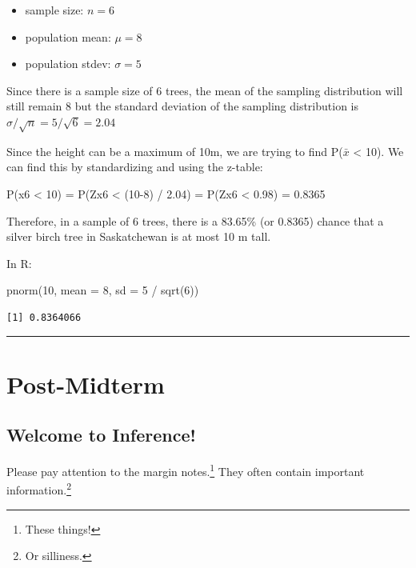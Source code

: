 \documentclass[
  letterpaper,
  DIV=11,
  numbers=noendperiod,
  oneside]{scrreprt}
\newenvironment{Shaded}{\begin{snugshade}}{\end{snugshade}}
\newcommand{\AttributeTok}[1]{\textcolor[rgb]{0.40,0.45,0.13}{#1}}
\newcommand{\DecValTok}[1]{\textcolor[rgb]{0.68,0.00,0.00}{#1}}
\newcommand{\FunctionTok}[1]{\textcolor[rgb]{0.28,0.35,0.67}{#1}}
\newcommand{\NormalTok}[1]{\textcolor[rgb]{0.00,0.23,0.31}{#1}}
\newcommand{\SpecialCharTok}[1]{\textcolor[rgb]{0.37,0.37,0.37}{#1}}
\providecommand{\tightlist}{%
  \setlength{\itemsep}{0pt}\setlength{\parskip}{0pt}}\usepackage{longtable,booktabs,array}
\begin{document}
\begin{itemize}
\tightlist
\item
  sample size: \(n = 6\)
\item
  population mean: \(\mu = 8\)
\item
  population stdev: \(\sigma = 5\)
\end{itemize}

Since there is a sample size of 6 trees, the mean of the sampling
distribution will still remain 8 but the standard deviation of the
sampling distribution is \(\sigma/\sqrt{n} = 5 / \sqrt{6} = 2.04\)

Since the height can be a maximum of 10m, we are trying to find
P(\(\bar x\) \textless{} 10). We can find this by standardizing and
using the z-table:

P(x6 \textless{} 10) = P(Zx6 \textless{} (10-8) / 2.04) = P(Zx6
\textless{} 0.98) = 0.8365

Therefore, in a sample of 6 trees, there is a 83.65\% (or 0.8365) chance
that a silver birch tree in Saskatchewan is at most 10 m tall.

In R:

\begin{Shaded}
\begin{Highlighting}[]
\FunctionTok{pnorm}\NormalTok{(}\DecValTok{10}\NormalTok{, }\AttributeTok{mean =} \DecValTok{8}\NormalTok{, }\AttributeTok{sd =} \DecValTok{5} \SpecialCharTok{/} \FunctionTok{sqrt}\NormalTok{(}\DecValTok{6}\NormalTok{))}
\end{Highlighting}
\end{Shaded}

\begin{verbatim}
[1] 0.8364066
\end{verbatim}

\begin{center}\rule{0.5\linewidth}{0.5pt}\end{center}

\part{Post-Midterm}

\hypertarget{welcome-to-inference}{%
\chapter{Welcome to Inference!}\label{welcome-to-inference}}

Please pay attention to the margin notes.\footnote{These things!} They
often contain important information.\footnote{Or silliness.}
\end{document}
